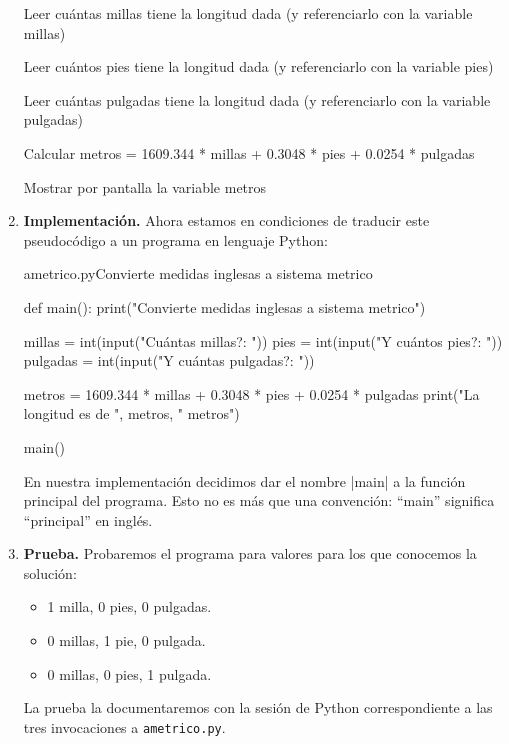 \begin{enumerate}
\begin{codigo-nohl-sn}
Leer cuántas millas tiene la longitud dada
 (y referenciarlo con la variable millas)

Leer cuántos pies tiene la longitud dada
 (y referenciarlo con la variable pies)

Leer cuántas pulgadas tiene la longitud dada
 (y referenciarlo con la variable pulgadas)

Calcular metros = 1609.344 * millas +
    0.3048 * pies + 0.0254 * pulgadas

Mostrar por pantalla la variable metros
\end{codigo-nohl-sn}

\item {\bf Implementación.} Ahora estamos en condiciones de
traducir este pseudocódigo a un programa en lenguaje Python:

\begin{codigo}{ametrico.py}{Convierte medidas inglesas a sistema metrico}
\begin{codigo-python}
def main():
    print("Convierte medidas inglesas a sistema metrico")

    millas = int(input("Cuántas millas?: "))
    pies = int(input("Y cuántos pies?: "))
    pulgadas = int(input("Y cuántas pulgadas?: "))

    metros = 1609.344 * millas + 0.3048 * pies + 0.0254 * pulgadas
    print("La longitud es de ", metros, " metros")

main()
\end{codigo-python}
\end{codigo}

\begin{nota}
En nuestra implementación decidimos dar el nombre |main| a la función principal
del programa. Esto no es más que una convención: ``main'' significa
``principal'' en inglés.
\end{nota}

\item {\bf Prueba.} Probaremos el programa para valores para los que conocemos
la solución:

\begin{itemize}
\item 1 milla, 0 pies, 0 pulgadas.
\item 0 millas, 1 pie, 0 pulgada.
\item 0 millas, 0 pies, 1 pulgada.
\end{itemize}

La prueba la documentaremos con la sesión de Python
correspondiente a las tres invocaciones a \lstinline!ametrico.py!.
\end{enumerate}

